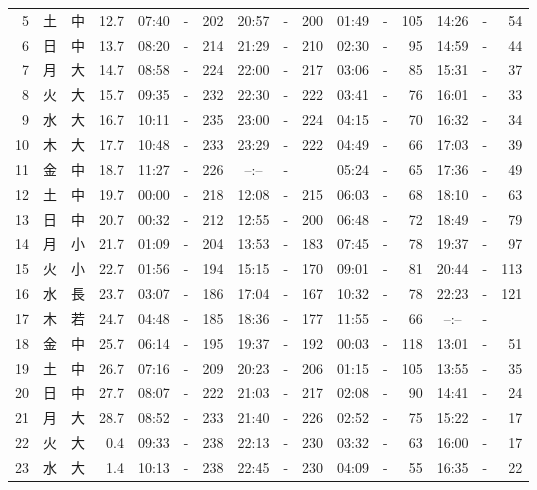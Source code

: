 \documentclass[12pt.a4j]{jsarticle}
\begin{document}
\begin{center}
\begin{table}[ht]
\begin{tabular}{|rc|cr|ccrccr|ccrccr|}
 5 & 土 & 中 & 12.7 &  07:40 &-& 202  &  20:57 &-& 200  &   01:49 &-& 105  &   14:26 &-&  54  \\
 6 & 日 & 中 & 13.7 &  08:20 &-& 214  &  21:29 &-& 210  &   02:30 &-&  95  &   14:59 &-&  44  \\
 7 & 月 & 大 & 14.7 &  08:58 &-& 224  &  22:00 &-& 217  &   03:06 &-&  85  &   15:31 &-&  37  \\
 8 & 火 & 大 & 15.7 &  09:35 &-& 232  &  22:30 &-& 222  &   03:41 &-&  76  &   16:01 &-&  33  \\
 9 & 水 & 大 & 16.7 &  10:11 &-& 235  &  23:00 &-& 224  &   04:15 &-&  70  &   16:32 &-&  34  \\
10 & 木 & 大 & 17.7 &  10:48 &-& 233  &  23:29 &-& 222  &   04:49 &-&  66  &   17:03 &-&  39  \\
11 & 金 & 中 & 18.7 &  11:27 &-& 226  &  --:-- &-&     &   05:24 &-&  65  &   17:36 &-&  49  \\
12 & 土 & 中 & 19.7 &  00:00 &-& 218  &  12:08 &-& 215  &   06:03 &-&  68  &   18:10 &-&  63  \\
13 & 日 & 中 & 20.7 &  00:32 &-& 212  &  12:55 &-& 200  &   06:48 &-&  72  &   18:49 &-&  79  \\
14 & 月 & 小 & 21.7 &  01:09 &-& 204  &  13:53 &-& 183  &   07:45 &-&  78  &   19:37 &-&  97  \\
15 & 火 & 小 & 22.7 &  01:56 &-& 194  &  15:15 &-& 170  &   09:01 &-&  81  &   20:44 &-& 113  \\
16 & 水 & 長 & 23.7 &  03:07 &-& 186  &  17:04 &-& 167  &   10:32 &-&  78  &   22:23 &-& 121  \\
17 & 木 & 若 & 24.7 &  04:48 &-& 185  &  18:36 &-& 177  &   11:55 &-&  66  &   --:-- &-&     \\
18 & 金 & 中 & 25.7 &  06:14 &-& 195  &  19:37 &-& 192  &   00:03 &-& 118  &   13:01 &-&  51  \\
19 & 土 & 中 & 26.7 &  07:16 &-& 209  &  20:23 &-& 206  &   01:15 &-& 105  &   13:55 &-&  35  \\
20 & 日 & 中 & 27.7 &  08:07 &-& 222  &  21:03 &-& 217  &   02:08 &-&  90  &   14:41 &-&  24  \\
21 & 月 & 大 & 28.7 &  08:52 &-& 233  &  21:40 &-& 226  &   02:52 &-&  75  &   15:22 &-&  17  \\
22 & 火 & 大 &  0.4 &  09:33 &-& 238  &  22:13 &-& 230  &   03:32 &-&  63  &   16:00 &-&  17  \\
23 & 水 & 大 &  1.4 &  10:13 &-& 238  &  22:45 &-& 230  &   04:09 &-&  55  &   16:35 &-&  22  \\

\end{tabular}
\end{table}
\end{center}
\end{document}
